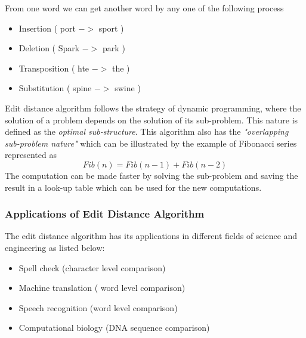\documentclass{bmcart}
\begin{document}
From one word we can get another word by any one of the following process

\begin{itemize}
\item Insertion ( port $->$ sport )
\item Deletion ( Spark $->$ park )
\item Transposition ( hte $->$ the )
\item Substitution ( spine $->$ swine )
\end{itemize}

Edit distance algorithm follows the strategy of dynamic programming, where the solution of a problem depends on the solution of its sub-problem.  This nature is defined as the {\textit{optimal sub-structure}}. This algorithm also has the \textit{"overlapping sub-problem nature"} which can be illustrated by the example of Fibonacci series represented as 
\begin{equation}
Fib(n)=Fib(n-1)+Fib(n-2)
\end{equation}
The computation can be made faster by solving the sub-problem and saving the result in a look-up table which can be used for the new computations.

\subsubsection{Applications of Edit Distance Algorithm}
\label{sssec:appln_editDist}
The edit distance algorithm has its applications in different fields of science and engineering as listed below:
\begin{itemize}
\item Spell check (character level comparison)
\item Machine translation ( word level comparison)
\item Speech recognition (word level comparison)
\item Computational biology (DNA sequence comparison)
\end{itemize}
\end{document}
